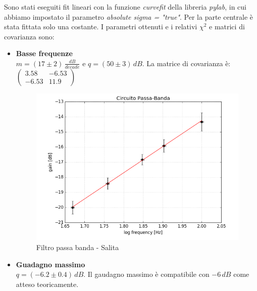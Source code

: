 \documentclass[10pt,a4paper]{article}
\begin{document}
Sono stati eseguiti fit lineari con la funzione \emph{curvefit} della libreria \emph{pylab}, in cui abbiamo impostato il parametro \emph{absolute sigma = "true"}. Per la parte centrale è stata fittata solo una costante. I parametri ottenuti e i relativi $\chi^2$ e matrici di covarianza sono:

\begin{itemize}
\item \textbf{Basse frequenze}\\
$ m = (17 \pm 2) \, \frac{dB}{decade}$ e $q = (50 \pm 3) \, dB$. La matrice di covarianza è: 
$\left(\begin{array}{cc}
3.58 & -6.53 \\ 
-6.53 & 11.9
\end{array} \right)$

\begin{figure}[h]
\centering
\includegraphics[scale=0.4]{immagine6.png}
\caption{Filtro passa banda - Salita}
\end{figure}

\item \textbf{Guadagno massimo}\\
$q = (-6.2 \pm 0.4) \, dB$. Il gaudagno massimo è compatibile con $-6 \, dB$ come atteso teoricamente.


\end{itemize}
\end{document}

